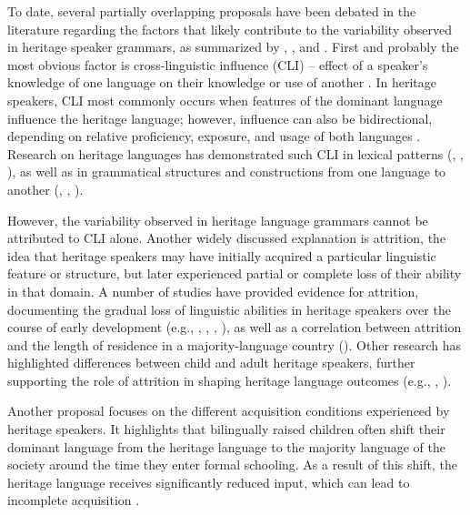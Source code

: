 To date, several partially overlapping proposals have been debated in the literature regarding the factors that likely contribute to the variability observed in heritage speaker grammars, as summarized by \citet{Montrul2015},  \citet{SchmidEtAl2019}, and \citet{Polinsky_Scontras_2020a, PolinskyScontras2020b}. First and probably the most obvious factor is cross-linguistic influence (CLI) -- effect of a speaker’s knowledge of one language on their knowledge or use of another \citet{jarvis_crosslinguistic_2008}. In heritage speakers, CLI most commonly occurs when features of the dominant language influence the heritage language; however, influence can also be bidirectional, depending on relative proficiency, exposure, and usage of both languages \citet{pavlenko_bidirectional_2002}. Research on heritage languages has demonstrated such CLI in lexical patterns (\citealt{DogruozBackus2009}, \citealt{Treffers-dallerEtAl2016}, \citealt{KopotevEtAl2024}), as well as in grammatical structures and constructions from one language to another (\citealt{Montrul2010}, \citealt{MontrulIonin2012}, \citealt{Van2019}).

However, the variability observed in heritage language grammars cannot be attributed to CLI alone. Another widely discussed explanation is attrition, the idea that heritage speakers may have initially acquired a particular linguistic feature or structure, but later experienced partial or complete loss of their ability in that domain. A number of studies have provided evidence for attrition, documenting the gradual loss of linguistic abilities in heritage speakers over the course of early development (e.g., \citealt{Anderson1999}, \citealt{Schmid2011}, \citealt{Silva-corvalan2014}, \citealt{Flores2015}), as well as a correlation between attrition and the length of residence in a majority-language country (\citealt{KimKim2022}). Other research has highlighted differences between child and adult heritage speakers, further supporting the role of attrition in shaping heritage language outcomes (e.g., \citealt{Montrul2015}, \citealt{Polinsky2011, Polinsky2018}).

Another proposal focuses on the different acquisition conditions experienced by heritage speakers. It highlights that bilingually raised children often shift their dominant language from the heritage language to the majority language of the society around the time they enter formal schooling. As a result of this shift, the heritage language receives significantly reduced input, which can lead to incomplete acquisition \citep{Polinsky1997, ravid_word_2005, Montrul2002, Montrul2006}.

